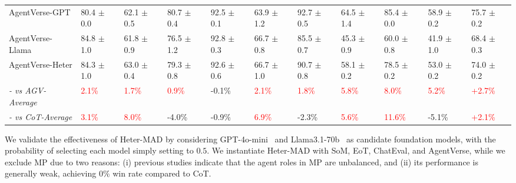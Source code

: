 \begin{table*}[tb!]
{\begin{tabular}{l|lllllllll|l}
\hline
AgentVerse-GPT          &  80.4 $\pm$ 0.0 &  62.1 $\pm$ 0.5 &  \cellcolor{green!25}80.7 $\pm$ 0.4 &  92.5 $\pm$ 0.1 &  63.9 $\pm$ 1.2 &  \cellcolor{green!25}92.7 $\pm$ 0.5 &  \cellcolor{green!25}64.5 $\pm$ 1.4 &  \cellcolor{green!75}85.4 $\pm$ 0.0 &  \cellcolor{green!75}58.9 $\pm$ 0.2 & \cellcolor{green!25}75.7 $\pm$ 0.2 \\
AgentVerse-Llama        &\cellcolor{green!75}84.8 $\pm$ 1.0 &  61.8 $\pm$ 0.9 &  76.5 $\pm$ 1.2 &  \cellcolor{green!25}92.8 $\pm$ 0.3 &  \cellcolor{green!25}66.7 $\pm$ 0.8 &  85.5 $\pm$ 0.7 &  45.3 $\pm$ 0.9 &  60.0 $\pm$ 0.8 &  41.9 $\pm$ 1.0& 68.4 $\pm$ 0.3   \\
AgentVerse-Heter        & 84.3 $\pm$ 1.0 & \cellcolor{green!25}63.0 $\pm$ 0.4    & 79.3 $\pm$ 0.8          & 92.6 $\pm$ 0.6          & \cellcolor{green!25}66.7 $\pm$ 1.0      & 90.7 $\pm$ 0.8  & 58.1 $\pm$ 0.2 & 78.5 $\pm$ 0.2      & 53.0 $\pm$ 0.2 & 74.0 $\pm$ 0.2  \\
\textit{- vs AGV-Average} &\textcolor{red}{2.1\%} & \textcolor{red}{1.7\%} & \textcolor{red}{0.9\%} & -0.1\% & \textcolor{red}{2.1\%} & \textcolor{red}{1.8\%} & \textcolor{red}{5.8\%} & \textcolor{red}{8.0\%} & \textcolor{red}{5.2\%} & \textcolor{red}{+2.7\%}\\
\textit{- vs CoT-Average} &\textcolor{red}{3.1\%}&\textcolor{red}{8.0\%}&-4.0\%&-0.9\%&\textcolor{red}{6.9\%}&-2.3\%&\textcolor{red}{5.6\%}&\textcolor{red}{11.6\%}&-5.1\%&\textcolor{red}{+2.1\%}\\
\bottomrule
\hline
\end{tabular}}

\end{table*}

We validate the effectiveness of Heter-MAD by considering GPT-4o-mini~\citep{gpt4o-mini} and Llama3.1-70b~\citep{llama3} as candidate foundation models, with the probability of selecting each model simply setting to $0.5$. We instantiate Heter-MAD with SoM, EoT, ChatEval, and AgentVerse, while we exclude MP due to two reasons: (i) previous studies indicate that the agent roles in MP are unbalanced, and (ii) its performance is generally weak, achieving $0\%$ win rate compared to CoT.      %


